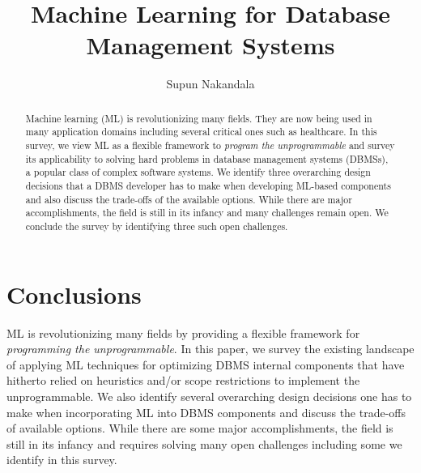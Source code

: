 \documentclass[sigconf, 10pt]{acmart}
\newcommand{\titlename}{Machine Learning for Database Management Systems}
\begin{document}
\sloppy
\title{\titlename}

\author{Supun Nakandala}


\begin{abstract}
Machine learning (ML) is revolutionizing many fields. They are now being used in many application domains including several critical ones such as healthcare.
In this survey, we view ML as a flexible framework to \textit{program the unprogrammable} and survey its applicability to solving hard problems in database management systems (DBMSs), a popular class of complex software systems.
We identify three overarching design decisions that a DBMS developer has to make when developing ML-based components and also discuss the trade-offs of the available options.
While there are major accomplishments, the field is still in its infancy and many challenges remain open.
We conclude the survey by identifying three such open challenges.
\end{abstract}

\maketitle









\section{Conclusions}
ML is revolutionizing many fields by providing a flexible framework for \textit{programming the unprogrammable}.
In this paper, we survey the existing landscape of applying ML techniques for optimizing DBMS internal components that have hitherto relied on heuristics and/or scope restrictions to implement the unprogrammable.
We also identify several overarching design decisions one has to make when incorporating ML into DBMS components  and discuss the trade-offs of available options.
While there are some major accomplishments, the field is still in its infancy and requires solving many open challenges including some we identify in this survey.




\balance

\end{document}
